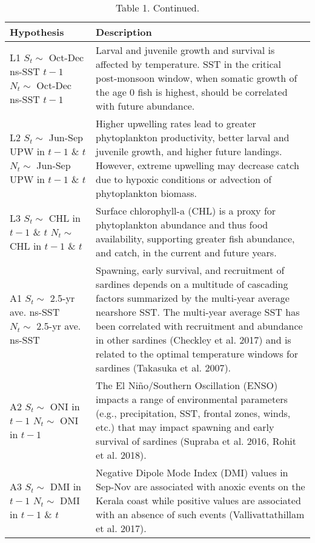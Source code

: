 \documentclass[]{article}
\begin{document}
\begin{table}

\caption{\label{tab:unnamed-chunk-2}Table 1. Continued.}
\centering
\begin{tabular}[t]{>{\raggedright\arraybackslash}p{5.5cm}|>{\raggedright\arraybackslash}p{10cm}}
\hline
Hypothesis & Description\\
\hline
L1 \newline $S_t \sim$ Oct-Dec ns-SST $t-1$ \newline $N_t \sim$ Oct-Dec ns-SST $t-1$ & Larval and juvenile growth and survival is affected by temperature. SST in the critical post-monsoon window, when somatic growth of the age 0 fish is highest, should be correlated with future abundance.\\
\hline
L2 \newline $S_t \sim$ Jun-Sep UPW in $t-1$ \& $t$ \newline $N_t \sim$ Jun-Sep UPW in $t-1$ \& $t$ & Higher upwelling rates lead to greater phytoplankton productivity, better larval and juvenile growth, and higher future landings. However, extreme upwelling may decrease catch due to hypoxic conditions or advection of phytoplankton biomass.\\
\hline
L3 \newline $S_t\sim$ CHL in $t-1$ \& $t$ \newline $N_t \sim$ CHL in $t-1$ \& $t$ & Surface chlorophyll-a (CHL) is a proxy for phytoplankton abundance and thus food availability, supporting greater fish abundance, and catch, in the current and future years.\\
\hline
A1 \newline $S_t \sim$ 2.5-yr ave. ns-SST \newline $N_t \sim$ 2.5-yr ave. ns-SST & Spawning, early survival, and recruitment of sardines depends on a multitude of cascading factors summarized by the multi-year average  nearshore SST. The multi-year average SST has been correlated with recruitment and abundance in other sardines (Checkley et al. 2017) and is related to the optimal temperature windows for sardines (Takasuka et al. 2007).\\
\hline
A2 \newline $S_t \sim$ ONI in $t-1$ \newline $N_t \sim$ ONI in $t-1$ & The El Niño/Southern Oscillation (ENSO) impacts a range of environmental parameters (e.g., precipitation, SST, frontal zones, winds, etc.) that may impact spawning and early survival of sardines (Supraba et al. 2016, Rohit et al. 2018).\\
\hline
A3 \newline $S_t \sim$ DMI in $t-1$ \newline $N_t \sim$ DMI in $t-1$ \& $t$ & Negative Dipole Mode Index (DMI) values in Sep-Nov are associated with anoxic events on the Kerala coast while positive values are associated with an absence of such events (Vallivattathillam et al. 2017).\\
\hline
\end{tabular}
\end{table}
\end{document}
